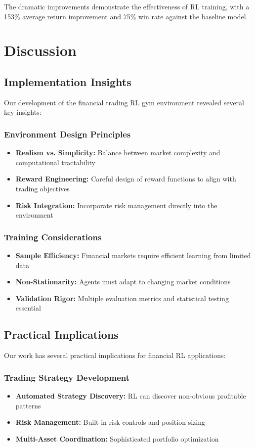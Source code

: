 \documentclass[10pt,journal]{IEEEtran}
\begin{document}
The dramatic improvements demonstrate the effectiveness of RL training, with a 153\% average return improvement and 75\% win rate against the baseline model.

\section{Discussion}

\subsection{Implementation Insights}
Our development of the financial trading RL gym environment revealed several key insights:

\subsubsection{Environment Design Principles}
\begin{itemize}
\item \textbf{Realism vs. Simplicity:} Balance between market complexity and computational tractability
\item \textbf{Reward Engineering:} Careful design of reward functions to align with trading objectives
\item \textbf{Risk Integration:} Incorporate risk management directly into the environment
\end{itemize}

\subsubsection{Training Considerations}
\begin{itemize}
\item \textbf{Sample Efficiency:} Financial markets require efficient learning from limited data
\item \textbf{Non-Stationarity:} Agents must adapt to changing market conditions
\item \textbf{Validation Rigor:} Multiple evaluation metrics and statistical testing essential
\end{itemize}

\subsection{Practical Implications}
Our work has several practical implications for financial RL applications:

\subsubsection{Trading Strategy Development}
\begin{itemize}
\item \textbf{Automated Strategy Discovery:} RL can discover non-obvious profitable patterns
\item \textbf{Risk Management:} Built-in risk controls and position sizing
\item \textbf{Multi-Asset Coordination:} Sophisticated portfolio optimization
\end{itemize}
\end{document}
